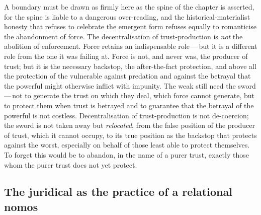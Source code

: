 A boundary must be drawn as firmly here as the spine of the chapter is asserted, for the spine is liable to a dangerous over-reading, and the historical-materialist honesty that refuses to celebrate the emergent form refuses equally to romanticise the abandonment of force. The decentralisation of trust-production is \emph{not} the abolition of enforcement. Force retains an indispensable role\,---\,but it is a different role from the one it was failing at. Force is not, and never was, the producer of trust; but it is the necessary backstop, the after-the-fact protection, and above all the protection of the vulnerable against predation and against the betrayal that the powerful might otherwise inflict with impunity. The weak still need the sword\,---\,not to generate the trust on which they deal, which force cannot generate, but to protect them when trust is betrayed and to guarantee that the betrayal of the powerful is not costless. Decentralisation of trust-production is not de-coercion; the sword is not taken away but \emph{relocated}, from the false position of the producer of trust, which it cannot occupy, to its true position as the backstop that protects against the worst, especially on behalf of those least able to protect themselves. To forget this would be to abandon, in the name of a purer trust, exactly those whom the purer trust does not yet protect.

\subsection{The juridical as the practice of a relational nomos}
\label{p13:sub:jud-nomos}

